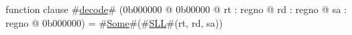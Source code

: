 function clause #\hyperref[zdecode]{decode}# (0b000000 @ 0b00000 @ rt : regno @ rd : regno @ sa : regno @ 0b000000) =
  #\hyperref[zSome]{Some}#(#\hyperref[zSLL]{SLL}#(rt, rd, sa))
